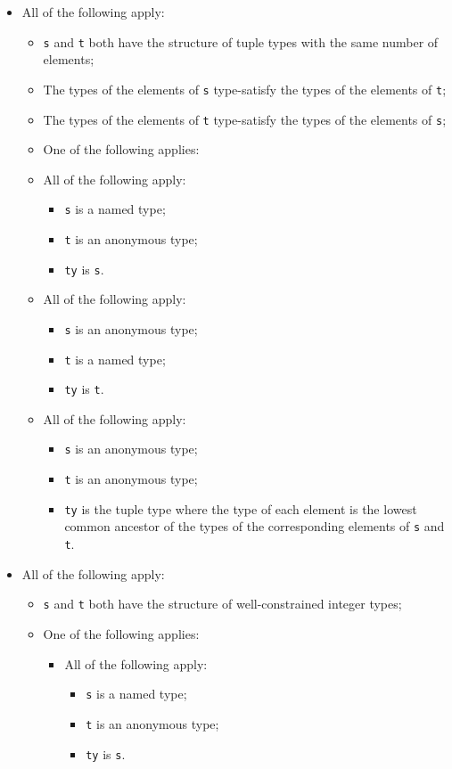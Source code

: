 \documentclass{book}
\begin{document}
\begin{itemize}
  \item All of the following apply:
    \begin{itemize}
    \item \texttt{s} and \texttt{t} both have the structure of tuple types with the same number of elements;
    \item The types of the elements of \texttt{s} type-satisfy the types of the elements of \texttt{t};
    \item The types of the elements of \texttt{t} type-satisfy the types of the elements of \texttt{s};
    \item One of the following applies:

      \item All of the following apply:
        \begin{itemize}
        \item \texttt{s} is a named type;
        \item \texttt{t} is an anonymous type;
        \item \texttt{ty} is \texttt{s}.
        \end{itemize}

      \item All of the following apply:
        \begin{itemize}
        \item \texttt{s} is an anonymous type;
        \item \texttt{t} is a named type;
        \item \texttt{ty} is \texttt{t}.
        \end{itemize}

     \item All of the following apply:
        \begin{itemize}
        \item \texttt{s} is an anonymous type;
        \item \texttt{t} is an anonymous type;
	\item \texttt{ty} is the tuple type where the type of each element is the lowest common
	  ancestor of the types of the corresponding elements of \texttt{s} and \texttt{t}.
        \end{itemize}
    \end{itemize}

  \item All of the following apply:
    \begin{itemize}
    \item \texttt{s} and \texttt{t} both have the structure of well-constrained integer types;
    \item One of the following applies:
      \begin{itemize}
      \item All of the following apply:
        \begin{itemize}
        \item \texttt{s} is a named type;
        \item \texttt{t} is an anonymous type;
        \item \texttt{ty} is \texttt{s}.
        \end{itemize}


\end{itemize}
\end{itemize}
\end{itemize}
\end{document}
